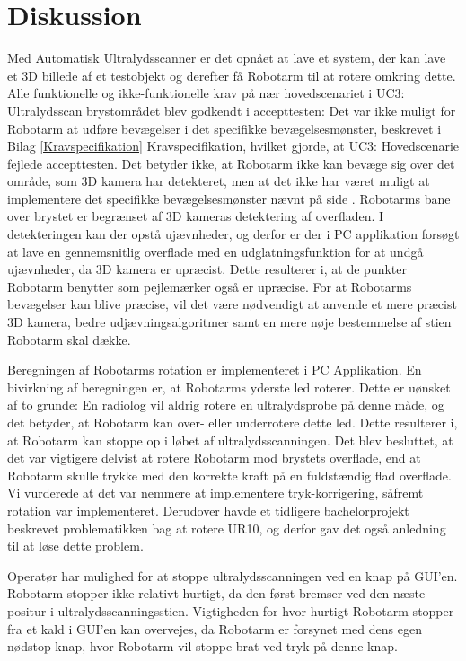\chapter{Diskussion}\label{kapitel_Diskussion}
Med Automatisk Ultralydsscanner er det opnået at lave et system, der kan lave et 3D billede af et testobjekt og derefter få Robotarm til at rotere omkring dette. Alle funktionelle og ikke-funktionelle krav på nær hovedscenariet i UC3: Ultralydsscan brystområdet blev godkendt i accepttesten: \newline
Det var ikke muligt for Robotarm at udføre bevægelser i det specifikke bevægelsesmønster, beskrevet i Bilag \ref{Kravspecifikation} Kravspecifikation, hvilket gjorde, at UC3: Hovedscenarie fejlede accepttesten. Det betyder ikke, at Robotarm ikke kan bevæge sig over det område, som 3D kamera har detekteret, men at det ikke har været muligt at implementere det specifikke bevægelsesmønster nævnt på side \pageref{Probensbevagelse}. Robotarms bane over brystet er begrænset af 3D kameras detektering af overfladen. I detekteringen kan der opstå ujævnheder, og derfor er der i PC applikation forsøgt at lave en gennemsnitlig overflade med en udglatningsfunktion for at undgå ujævnheder, da 3D kamera er upræcist. Dette resulterer i, at de punkter Robotarm benytter som pejlemærker også er upræcise. For at Robotarms bevægelser kan blive præcise, vil det være nødvendigt at anvende et mere præcist 3D kamera, bedre udjævningsalgoritmer samt en mere nøje bestemmelse af stien Robotarm skal dække.

Beregningen af Robotarms rotation er implementeret i PC Applikation. En bivirkning af beregningen er, at Robotarms yderste led roterer. Dette er uønsket af to grunde: En radiolog vil aldrig rotere en ultralydsprobe på denne måde, og det betyder, at Robotarm kan over- eller underrotere dette led. Dette resulterer i, at Robotarm kan stoppe op i løbet af ultralydsscanningen. Det blev besluttet, at det var vigtigere delvist at rotere Robotarm mod brystets overflade, end at Robotarm skulle trykke med den korrekte kraft på en fuldstændig flad overflade. Vi vurderede at det var nemmere at implementere tryk-korrigering, såfremt rotation var implementeret. Derudover havde et tidligere bachelorprojekt beskrevet problematikken bag at rotere UR10, og derfor gav det også anledning til at løse dette problem.

Operatør har mulighed for at stoppe ultralydsscanningen ved en knap på GUI'en. Robotarm stopper ikke relativt hurtigt, da den først bremser ved den næste positur i ultralydsscanningsstien. Vigtigheden for hvor hurtigt Robotarm stopper fra et kald i GUI'en kan overvejes, da Robotarm er forsynet med dens egen nødstop-knap, hvor Robotarm vil stoppe brat ved tryk på denne knap.

